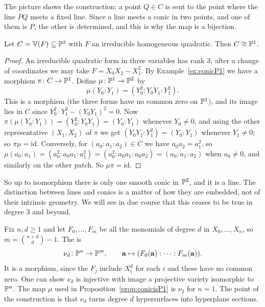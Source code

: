 \documentclass[a4paper]{scrartcl}
\newcommand{\V}{\mathbb{V}}
\begin{document}
The picture shows the construction: a point $Q \in C$ is sent to the point where the line $PQ$ meets a fixed line. Since a line meets a conic in two points, and one of them is $P$, the other is determined, and this is why the map is a bijection.

\begin{proposition}\label{prop:conicisP1}
	Let $C = \V(F) \subseteq \PP^2$ with $F$ an irreducible homogeneous quadratic. Then $C \cong \mathbb{P}^1$.
\end{proposition}

\begin{proof}
	An irreducible quadratic form in three variables has rank $3$; after a change of coordinates we may take $F = X_0X_2 - X_1^2$. By Example~\ref{ex:conicP1} we have a morphism $\pi \colon C \to \mathbb{P}^1$. Define $\mu \colon \mathbb{P}^1 \to \mathbb{P}^2$ by
	$$\mu(Y_0:Y_1) = (Y_0^2 : Y_0Y_1 : Y_1^2).$$
	This is a morphism (the three forms have no common zero on $\mathbb{P}^1$), and its image lies in $C$ since $Y_0^2\cdot Y_1^2 - (Y_0Y_1)^2 = 0$. Now $\pi(\mu(Y_0:Y_1)) = (Y_0^2 : Y_0Y_1) = (Y_0:Y_1)$ whenever $Y_0 \neq 0$, and using the other representative $(X_1,X_2)$ of $\pi$ we get $(Y_0Y_1 : Y_1^2) = (Y_0:Y_1)$ whenever $Y_1 \neq 0$; so $\pi\mu = \mathrm{id}$. Conversely, for $(a_0:a_1:a_2) \in C$ we have $a_0a_2 = a_1^2$, so $\mu(a_0:a_1) = (a_0^2 : a_0a_1 : a_1^2) = (a_0^2 : a_0a_1 : a_0a_2) = (a_0:a_1:a_2)$ when $a_0 \neq 0$, and similarly on the other patch. So $\mu\pi = \mathrm{id}$.
\end{proof}

So up to isomorphism there is only one smooth conic in $\mathbb{P}^2$, and it is a line. The distinction between lines and conics is a matter of how they are embedded, not of their intrinsic geometry. We will see in due course that this ceases to be true in degree $3$ and beyond.

\begin{example}
	Fix $n,d \geq 1$ and let $F_0,\dots,F_m$ be all the monomials of degree $d$ in $X_0,\dots,X_n$, so $m = \binom{n+d}{d}-1$. The  is
	$$\nu_d \colon \mathbb{P}^n \to \mathbb{P}^m, \qquad \mathbf a \mapsto (F_0(\mathbf a) : \cdots : F_m(\mathbf a)).$$
	It is a morphism, since the $F_j$ include $X_i^d$ for each $i$ and these have no common zero. One can show $\nu_d$ is injective with image a projective variety isomorphic to $\mathbb{P}^n$. The map $\mu$ used in Proposition~\ref{prop:conicisP1} is $\nu_2$ for $n=1$. The point of the construction is that $\nu_d$ turns degree $d$ hypersurfaces into hyperplane sections.
\end{example}
\end{document}
